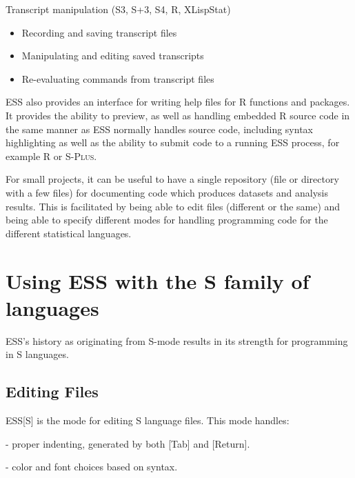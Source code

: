 \documentclass{article}
\newcommand*{\Splus}{\textsc{S-Plus}}
\begin{document}
Transcript manipulation (S3, S+3, S4, R, XLispStat)
\begin{itemize}
\item Recording and saving transcript files
\item Manipulating and editing saved transcripts
\item Re-evaluating commands from transcript files
\end{itemize}

ESS also provides an interface for writing help files for R functions
and packages.    It provides the ability to preview, as well as
handling embedded R source code in the same manner as ESS normally
handles source code, including syntax highlighting as well as the
ability to submit code to a running ESS process, for example R or
\Splus. 

For small projects, it can be useful to have a single repository (file
or directory with a few files) for documenting code which produces
datasets and analysis results.  This is facilitated by being able to
edit files (different or the same) and being able to specify different
modes for handling programming code for the different statistical
languages.

\section{Using ESS with the S family of languages}
\label{sec:S}

ESS's history as originating from S-mode results in its strength for
programming in S languages.

\subsection{Editing Files}
\label{sec:S:edit}

ESS[S] is the mode for editing S language files.  This mode handles:

- proper indenting, generated by both [Tab] and [Return].

- color and font choices based on syntax.
\end{document}
